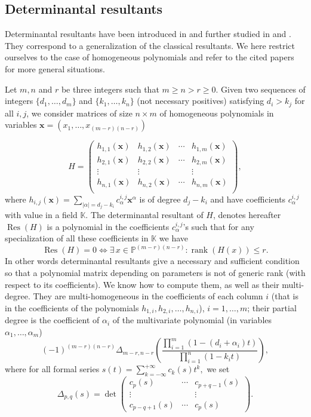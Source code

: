 \documentclass[10pt]{amsart}
\theoremstyle{plain}
\theoremstyle{definition}
\def\PP{{\mathbb{P}}}
\def\KK{{\mathbb{K}}}
\def\x{\mathbf{x}}
\DeclareMathOperator\Res{Res}
\DeclareMathOperator\rank{rank}
\begin{document}
\subsection{Determinantal resultants}
Determinantal resultants have been introduced in \cite{BusPhD} and further studied in \cite{Bus04} and \cite{BuGa05}. They correspond to a generalization of the classical resultants. We here restrict ourselves to the case of homogeneous polynomials and refer to the cited papers for more general situations.

Let $m,n$ and $r$ be three integers such that $m\geq n > r \geq 0$. Given two sequences of integers $\{d_1,\ldots,d_m\}$ and $\{k_1,\ldots,k_n\}$ (not necessary positives) satisfying $d_i > k_j$ for all  $i,j$, we consider matrices of size $n\times m$ of homogeneous polynomials in variables $\x=(x_1,\ldots,x_{(m-r)(n-r)})$ 

$$H=\left( \begin{array}{cccc}
    h_{1,1}(\x) & h_{1,2}(\x) & \cdots & h_{1,m}(\x) \\
    h_{2,1}(\x) & h_{2,2}(\x) & \cdots & h_{2,m}(\x) \\
    \vdots & \vdots & & \vdots \\
    h_{n,1}(\x) & h_{n,2}(\x) & \cdots & h_{n,m}(\x) \\
  \end{array} \right),$$
where $h_{i,j}(\x)=\sum_{|\alpha|=d_j-k_i}c_{\alpha}^{i,j}\x^\alpha$ is of degree $d_j-k_i$ and have coefficients $c_{\alpha}^{i,j}$ with value in a field $\KK$. The determinantal resultant of $H$, denotes hereafter $\Res(H)$ is a polynomial in the coefficients $c_{\alpha}^{i,j}$'s such that for any specialization of all these coefficients in $\KK$ we have
$$\Res(H)=0 \Leftrightarrow \exists \, x \in \PP^{(m-r)(n-r)} : \rank(H(x))\leq r.$$
In other words determinantal resultants give a necessary and sufficient condition so that a polynomial matrix depending on parameters is not of generic rank (with respect to its coefficients). We know how to compute them, as well as their multi-degree. They are multi-homogeneous in the coefficients of each column $i$ (that is in the
coefficients of the polynomials $h_{1,i},h_{2,i},\ldots,h_{n,i}$), $i=1,\ldots,m$; their partial degree 
is the
coefficient of $\alpha_i$ of the multivariate polynomial (in variables
$\alpha_1,\ldots,\alpha_m$)
\begin{equation*}\label{degr}
(-1)^{(m-r)(n-r)}\Delta_{m-r,n-r}\left(\frac{\prod_{i=1}^{m}(1-(d_i+\alpha_i)t)}{\prod_{i=1}^{n}(1-k_it)}\right),
\end{equation*}
where for all formal series $s(t)=\sum_{k=-\infty}^{+\infty}c_k(s)t^k,$ 
we set 
$$\Delta_{p,q}(s)=\det\left(
         \begin{array}{ccc}
          c_p(s) & \cdots & c_{p+q-1}(s) \\
          \vdots & & \vdots \\
          c_{p-q+1}(s) & \cdots & c_p(s)
         \end{array}
  \right).$$
\end{document}
